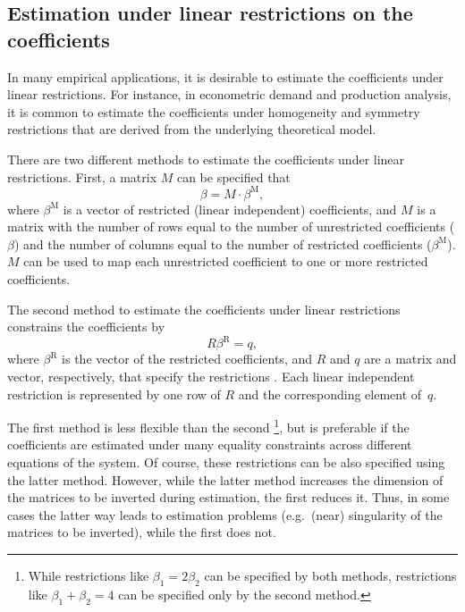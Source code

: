 \subsection{Estimation under linear restrictions on the coefficients}
\label{sec:Restrictions}

In many empirical applications,
it is desirable to estimate the coefficients under linear restrictions.
For instance, in econometric demand and production analysis,
it is common to estimate the coefficients
under homogeneity and symmetry restrictions
that are derived from the underlying theoretical model.

There are two different methods to estimate the coefficients
under linear restrictions.
First, a matrix $M$ can be specified that
\begin{equation}
   \beta = M \cdot \beta^\text{M} \label{eq:T-restr} ,
\end{equation}
where $\beta^\text{M}$ is a vector of restricted (linear independent) coefficients,
and $M$ is a matrix with the number of rows equal to the number of
unrestricted coefficients ($\beta$) and
the number of columns equal to the number of restricted coefficients
($\beta^\text{M}$).
$M$ can be used to map each unrestricted coefficient to one or more
restricted coefficients.

The second method to estimate the coefficients under linear restrictions
constrains the coefficients by
\begin{equation}
   R \beta^\text{R} = q ,
   \label{eq:restr-R}
\end{equation}
where $\beta^\text{R}$ is the vector of the restricted coefficients,
and $R$ and $q$ are a matrix and vector, respectively,
that specify the restrictions \citep[see][p.~100]{greene03}.
Each linear independent restriction is represented by one row of $R$
and the corresponding element of~$q$.

The first method is less flexible than the second%
\footnote{
While restrictions like $\beta_1 = 2 \beta_2$ can be specified by
both methods,
restrictions like $\beta_1 + \beta_2 = 4$ can be specified only
by the second method.
}, 
but is preferable if the coefficients are estimated
under many equality constraints across different equations of the system.
Of course, these restrictions can be also specified using
the latter method.
However, while the latter method increases the dimension of the 
matrices to be inverted during estimation, the first reduces it. 
Thus, in some cases the latter way leads to estimation problems
(e.g.\ (near) singularity of the matrices to be inverted),
while the first does not.

